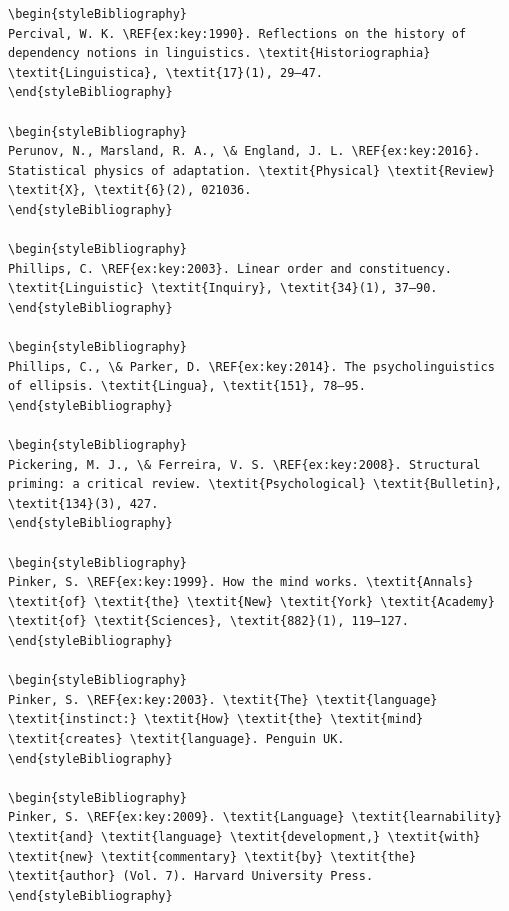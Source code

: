 \begin{verbatim}
\begin{styleBibliography}
Percival, W. K. \REF{ex:key:1990}. Reflections on the history of dependency notions in linguistics. \textit{Historiographia} \textit{Linguistica}, \textit{17}(1), 29–47.
\end{styleBibliography}

\begin{styleBibliography}
Perunov, N., Marsland, R. A., \& England, J. L. \REF{ex:key:2016}. Statistical physics of adaptation. \textit{Physical} \textit{Review} \textit{X}, \textit{6}(2), 021036.
\end{styleBibliography}

\begin{styleBibliography}
Phillips, C. \REF{ex:key:2003}. Linear order and constituency. \textit{Linguistic} \textit{Inquiry}, \textit{34}(1), 37–90.
\end{styleBibliography}

\begin{styleBibliography}
Phillips, C., \& Parker, D. \REF{ex:key:2014}. The psycholinguistics of ellipsis. \textit{Lingua}, \textit{151}, 78–95.
\end{styleBibliography}

\begin{styleBibliography}
Pickering, M. J., \& Ferreira, V. S. \REF{ex:key:2008}. Structural priming: a critical review. \textit{Psychological} \textit{Bulletin}, \textit{134}(3), 427.
\end{styleBibliography}

\begin{styleBibliography}
Pinker, S. \REF{ex:key:1999}. How the mind works. \textit{Annals} \textit{of} \textit{the} \textit{New} \textit{York} \textit{Academy} \textit{of} \textit{Sciences}, \textit{882}(1), 119–127.
\end{styleBibliography}

\begin{styleBibliography}
Pinker, S. \REF{ex:key:2003}. \textit{The} \textit{language} \textit{instinct:} \textit{How} \textit{the} \textit{mind} \textit{creates} \textit{language}. Penguin UK.
\end{styleBibliography}

\begin{styleBibliography}
Pinker, S. \REF{ex:key:2009}. \textit{Language} \textit{learnability} \textit{and} \textit{language} \textit{development,} \textit{with} \textit{new} \textit{commentary} \textit{by} \textit{the} \textit{author} (Vol. 7). Harvard University Press.
\end{styleBibliography}


\end{verbatim}
